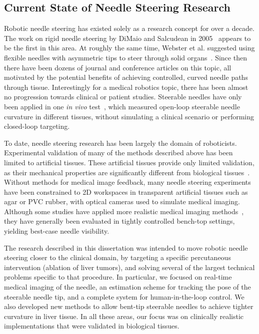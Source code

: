 \subsection{Current State of Needle Steering Research}
Robotic needle steering has existed solely as a research concept for over a decade. The work on rigid needle steering by DiMaio and Salcudean in 2005~\cite{DiMaio2005} appears to be the first in this area. At roughly the same time, Webster et al. suggested using flexible needles with asymmetric tips to steer through solid organs~\cite{Webster2005}. Since then there have been dozens of journal and conference articles on this topic, all motivated by the potential benefits of achieving controlled, curved needle paths through tissue. Interestingly for a medical robotics topic, there has been almost no progression towards clinical or patient studies. Steerable needles have only been applied in one \textit{in vivo} test~\cite{Majewicz2012}, which measured open-loop steerable needle curvature in different tissues, without simulating a clinical scenario or performing closed-loop targeting.

To date, needle steering research has been largely the domain of roboticists. Experimental validation of many of the methods described above has been limited to artificial tissues. These artificial tissues provide only limited validation, as their mechanical properties are significantly different from biological tissues~\cite{Wedlick2012}. Without methods for medical image feedback, many needle steering experiments have been constrained to 2D workspaces in transparent artificial tissues such as agar or PVC rubber, with optical cameras used to simulate medical imaging. Although some studies have applied more realistic medical imaging methods~\cite{Glozman2007,Neubach2010,Abayazid2014}, they have generally been evaluated in tightly controlled bench-top settings, yielding best-case needle visibility.

The research described in this dissertation was intended to move robotic needle steering closer to the clinical domain, by targeting a specific percutaneous intervention (ablation of liver tumors), and solving several of the largest technical problems specific to that procedure. In particular, we focused on real-time medical imaging of the needle, an estimation scheme for tracking the pose of the steerable needle tip, and a complete system for human-in-the-loop control. We also developed new methods to allow bent-tip steerable needles to achieve tighter curvature in liver tissue. In all these areas, our focus was on clinically realistic implementations that were validated in biological tissues.  

